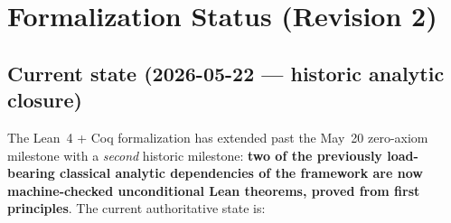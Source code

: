 \chapter*{Formalization Status (Revision 2)}

\section*{Current state (2026-05-22 --- historic analytic closure)}

The Lean~4 + Coq formalization has extended past the May~20 zero-axiom
milestone with a \emph{second} historic milestone: \textbf{two of the
previously load-bearing classical analytic dependencies of the
framework are now machine-checked unconditional Lean theorems, proved
from first principles}. The current authoritative state is:

